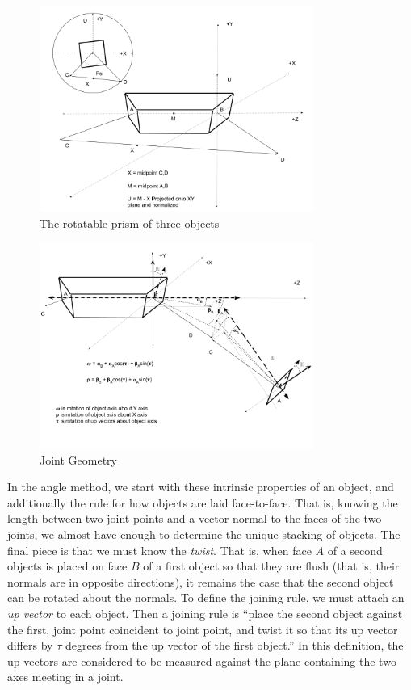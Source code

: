 \documentclass[11pt]{article}
\begin{document}
{\begin{figure}
     \centering
     \includegraphics[width=0.80\textwidth]{figures/ObjectForStackingSetup.png}
     \caption{The rotatable prism of three objects}
  \label{fig:intrinsicdiagram}
\end{figure}

\begin{figure}
     \centering
     \includegraphics[width=0.80\textwidth]{figures/JointGeometry.png}
     \caption{Joint Geometry}
  \label{fig:jointdiagram}
\end{figure}


In the angle method, we start with these intrinsic properties of an object, and additionally the
rule for how objects are laid face-to-face. That is, knowing the length between two
joint points and a vector normal to the faces of the two joints, we almost have
enough to determine the unique stacking of objects. The final piece is that we must
know the {\em twist}. That is, when face $A$ of a second objects is placed on face $B$
of a first object so that they are flush (that is, their normals are in opposite directions),
it remains the case that the second object can be rotated about the normals. To
define the joining rule, we must attach an {\em up vector} to each object. Then a joining
rule is ``place the second object against the first, joint point coincident to joint point,
and twist it so that its up vector differs by $\tau$ degrees from the up vector of the first
object.'' In this definition, the up vectors are considered to be measured against the plane
containing the two axes meeting in a joint.

}
\end{document}
